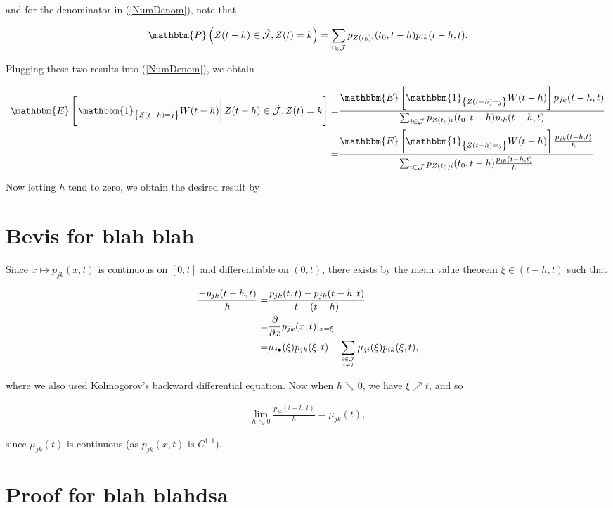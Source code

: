 \documentclass{book}
\newcommand{\1}[1]{\mathbbm{1}_{\left\lbrace #1 \right\rbrace}}
\newcommand{\expec}[1][def]{\mathbbm{E} \left[ #1 \right]}
\newcommand{\econd}[2][def]{\mathbbm{E} \left[ \left. #1 \right| #2 \right]}
\newcommand{\probability}[1][def]{\mathbbm{P} \left( #1 \right)}
\theoremstyle{break}
\theoremstyle{remark}
\numberwithin{equation}{section}
\begin{document}
and for the denominator in (\ref{NumDenom}), note that 


\begin{align*}
	\probability[Z(t-h) \in \hat{\mathcal{J}}, Z(t)=k] = \sum_{i \in \mathcal{J}} p_{Z(t_0)i}(t_0,t-h) p_{ik}(t-h,t).
\end{align*}

Plugging these two results into (\ref{NumDenom}), we obtain

\begin{align*}
	\econd[\1{Z(t-h)=j} W(t-h)]{Z(t-h) \in \hat{\mathcal{J}}, Z(t) = k} =& \frac{\expec[\1{Z(t-h)=j} W(t-h)] p_{jk}(t-h,t)}{\sum_{i \in \mathcal{J}} p_{Z(t_0)i}(t_0,t-h) p_{ik}(t-h,t)} \\
	=& \frac{\expec[\1{Z(t-h)=j} W(t-h)] \frac{p_{jk}(t-h,t)}{h}}{\sum_{i \in \mathcal{J}} p_{Z(t_0)i}(t_0,t-h) \frac{p_{ik}(t-h,t)}{h}} \\
\end{align*}

Now letting $h$ tend to zero, we obtain the desired result by 

\section{Bevis for blah blah} \label{TransIntenseProof}

Since $x \mapsto p_{jk}(x,t)$ is continuous on $[0,t]$ and differentiable on $(0,t)$, there exists by the mean value theorem $\xi \in ( t-h, t)$ such that

\begin{align*}
    \frac{-p_{jk}(t-h,t)}{h} =& \frac{p_{jk}(t,t)-p_{jk}(t-h,t)}{t-(t-h)} \\
    =& \frac{\partial}{\partial x} p_{jk}(x,t)|_{x=\xi} \\
    =& \mu_{j \bullet}(\xi) p_{jk}(\xi,t) - \sum_{i \in \mathcal{J} \atop i \neq j} \mu_{ji}(\xi) p_{ik}(\xi,t),
\end{align*}

where we also used Kolmogorov's backward differential equation. Now when $h \searrow 0$, we have $\xi \nearrow t$, and so

\begin{align*}
    \lim_{h \searrow 0} \frac{p_{jk}(t-h,t)}{h} = \mu_{jk}(t),
\end{align*}

since $\mu_{jk}(t)$ is continuous (as $p_{jk}(x,t)$ is $C^{1,1}$).

\section{Proof for blah blahdsa} \label{KolmoProof}
\end{document}

